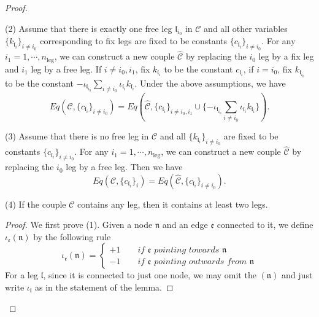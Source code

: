 \begin{proof}
\begin{lem}
(2) Assume that there is exactly one free leg $\mathfrak{l}_{i_0}$ in $\mathcal{C}$ and all other variables $\{k_{\mathfrak{l}_{i}}\}_{i\ne i_0}$ corresponding to fix legs are fixed to be constants $\{c_{\mathfrak{l}_{i}}\}_{i\ne i_0}$. For any $i_{1}=1,\cdots,n_{\text{leg}}$, we can construct a new couple $\widehat{\mathcal{C}}$ by replacing the $i_0$ leg by a fix leg and $i_1$ leg by a free leg. If $i\ne i_0, i_1$, fix $k_{\mathfrak{l}_{i}}$ to be the constant $c_{\mathfrak{l}_{i}}$, if $i=i_0$, fix $k_{\mathfrak{l}_{i_0}}$ to be the constant $-\iota_{\mathfrak{l}_{i_0}}\sum_{i\ne i_0} \iota_{\mathfrak{l}_i}k_{\mathfrak{l}_i}$. Under the above assumptions, we have
\begin{equation}
    Eq(\mathcal{C}, \{c_{\mathfrak{l}_{i}}\}_{i\ne i_0})=Eq\left(\widehat{\mathcal{C}}, \{c_{\mathfrak{l}_{i}}\}_{i\ne i_0, i_1}\cup \{-\iota_{\mathfrak{l}_{i_0}}\sum_{i\ne i_0} \iota_{\mathfrak{l}_i}k_{\mathfrak{l}_i}\}\right).
\end{equation}

(3) Assume that there is no free leg in $\mathcal{C}$ and all $\{k_{\mathfrak{l}_{i}}\}_{i\ne i_0}$ are fixed to be constants $\{c_{\mathfrak{l}_{i}}\}_{i\ne i_0}$. For any $i_{1}=1,\cdots,n_{\text{leg}}$, we can construct a new couple $\widehat{\mathcal{C}}$ by replacing the $i_0$ leg by a free leg. Then we have
\begin{equation}
    Eq(\mathcal{C}, \{c_{\mathfrak{l}_{i}}\}_{i})=Eq(\widehat{\mathcal{C}}, \{c_{\mathfrak{l}_{i}}\}_{i\ne i_0}).
\end{equation}

(4) If the couple $\mathcal{C}$ contains any leg, then it contains at least two legs.

\end{lem}
\begin{proof}
We first prove (1). Given a node $\mathfrak{n}$ and an edge $\mathfrak{e}$ connected to it, we define $\iota_{\mathfrak{e}}(\mathfrak{n})$ by the following rule
\begin{equation}
    \iota_{\mathfrak{e}}(\mathfrak{n})=\begin{cases}
        +1 \qquad \textit{if $\mathfrak{e}$ pointing towards $\mathfrak{n}$}
        \\
        -1 \qquad  \textit{if $\mathfrak{e}$ pointing outwards from $\mathfrak{n}$}
    \end{cases}
\end{equation}
For a leg $\mathfrak{l}$, since it is connected to just one node, we may omit the $(\mathfrak{n})$ and just write $\iota_{\mathfrak{l}}$ as in the statement of the lemma.


\end{proof}
\end{proof}
